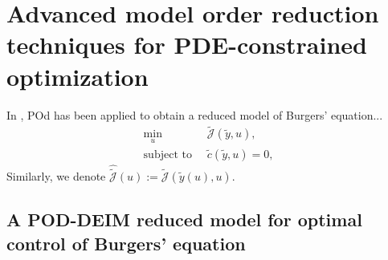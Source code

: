 \chapter{Advanced model order reduction techniques for PDE-constrained optimization}
In \cite{KV99}, POd has been applied to obtain a reduced model of Burgers' equation...
\begin{equation}
\label{allgControl_small}
\begin{split}
\min_{u} \ &\tilde{\mathcal{J}}(\tilde{y},u) ,\\
\text{subject to } \ &\tilde{c}(\tilde{y},u) = 0,
\end{split}
\end{equation}
Similarly, we denote $\hat{\tilde{\mathcal J}}(u) := \tilde{\mathcal{J}}(\tilde{y}(u),u)$.
\section{A POD-DEIM reduced model for optimal control of Burgers' equation}
\label{redOptimalControl}

